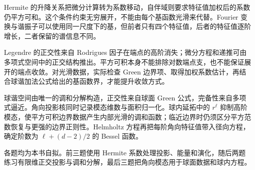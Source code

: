 



\begin{chaptersummary}
Hermite 的升降关系把微分计算转为系数移动，自伴域则要求特征值加权后的系数仍平方可和。这个条件约束无穷展开，不能由每个基函数光滑来代替。Fourier 变换与谐振子可以使用同一尺度下的基，但前者只有四个特征值，后者的特征值逐阶增长，二者保留的谱信息不同。

\ProseParagraphBreak

Legendre 的正交性来自 Rodrigues 因子在端点的高阶消失；微分方程和递推可由多项式空间中的正交结构推出。平方可积本身不能排除对数端点支，也不能保证展开的端点收敛。对光滑数据，实际检查 Green 边界项、取得加权系数估计，再结合球谐加法公式给出的基函数界，才能提升收敛方式。

\ProseParagraphBreak

球谐空间由唯一的调和分解构造，正交性来自球面 Green 公式，完备性来自多项式逼近。角向投影核同时记录模态维数与面积归一化。球内延拓中的 \(r^\ell\) 抑制高阶模态，使平方可积边界数据产生内部光滑的调和函数；临近边界时仍须区分平方范数恢复与更强的边界正则性。Helmholtz 方程再把每阶角向特征值带入径向方程，确定阶数为 \(\ell+(d-2)/2\) 的 Bessel 函数。
\end{chaptersummary}
\BookExercises

各题均为本书自拟。前三题使用 Hermite 系数处理投影、能量和演化，随后两题练习有限维正交投影与调和分解，最后三题把角向模态用于球面数据和球内方程。

